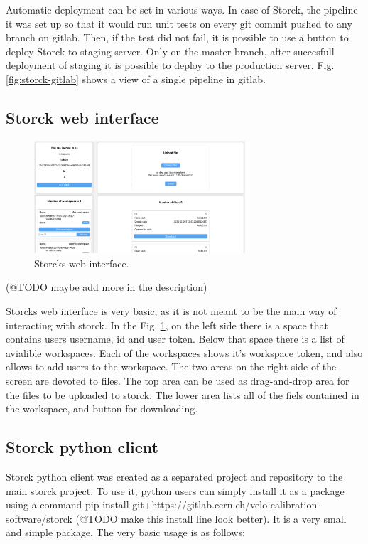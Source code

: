 Automatic deployment can be set in various ways.
In case of Storck, the pipeline it was set up so that it would run unit tests on every git commit pushed to any branch on gitlab.
Then, if the test did not fail, it is possible to use a button to deploy Storck to staging server.
Only on the master branch, after succesfull deployment of staging it is possible to deploy to the production server.
Fig. \ref{fig:storck-gitlab} shows a view of a single pipeline in gitlab.

\subsection{Storck web interface}

\begin{figure}[H]
\centering
\includegraphics[width=0.7\textwidth]{figures/chapter5/storck/screenshot_web.png}
\caption{Storcks web interface.}
\label{fig:storck-web-interface}
\end{figure}

(@TODO maybe add more in the description)

Storcks web interface is very basic, as it is not meant to be the main way of interacting with storck.
In the Fig. \ref{fig:storck-web-interface}, on the left side there is a space that contains users username, id and user token.
Below that space there is a list of avialible workspaces.
Each of the workspaces shows it's workspace token, and also allows to add users to the workspace.
The two areas on the right side of the screen are devoted to files.
The top area can be used as drag-and-drop area for the files to be uploaded to storck.
The lower area lists all of the fiels contained in the workspace, and button for downloading.


\subsection{Storck python client}

Storck python client was created as a separated project and repository to the main storck project.
To use it, python users can simply install it as a package using a command pip install git+https://gitlab.cern.ch/velo-calibration-software/storck
(@TODO make this install line look better).
It is a very small and simple package.
The very basic usage is as follows:

